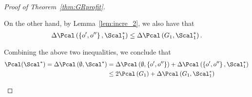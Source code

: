 \begin{proof}[Proof of Theorem~\ref{thm:GRprofit}]
\begin{itemize}
	On the other hand, by Lemma~\ref{lem:incre_2}, we also have that 
	\begin{align*}
	\Delta\Pcal\left(\left\{o',o''\right\},\Scal_1^*\right)\le \Delta\Pcal\left(G_1,\Scal^*_1\right).
	\end{align*}
	
	Combining the above two inequalities, we conclude that
	\begin{align*}
	\Pcal(\Scal^*) = \Delta\Pcal\left(\emptyset, \Scal^*\right)&= \Delta\Pcal\left(\emptyset, \left\{o',o''\right\}\right) + \Delta\Pcal\left(\left\{o',o''\right\}, \Scal^*_1\right) \\
	&\le 2\Pcal\left(G_1\right) + \Delta\Pcal\left(G_1,\Scal^*_1\right)
	\end{align*}	
\end{itemize}


\end{proof}

